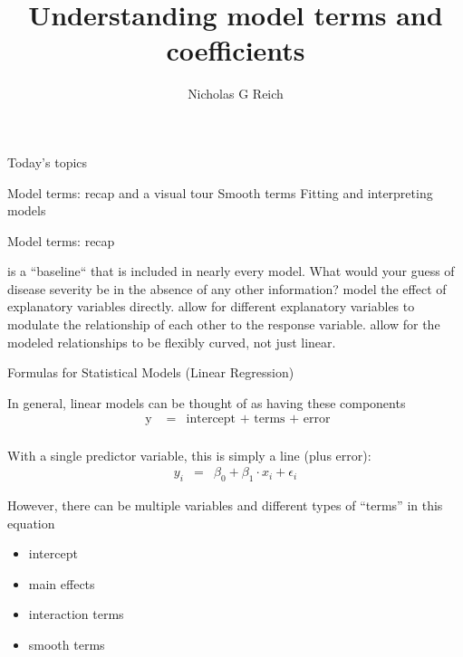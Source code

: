 \documentclass[table]{beamer}\usepackage[]{graphicx}\usepackage[]{color}
\title{Understanding model terms and coefficients}
\author{Nicholas G Reich}
\begin{document}
\begin{frame}[plain]
	\titlepage
\end{frame}











\begin{frame}{Today's topics}

\bi
    \myitem Model terms: recap and a visual tour
    \myitem Smooth terms
    \myitem Fitting and interpreting models
\ei



\end{frame}


\begin{frame}[fragile]{Model terms: recap}

\bi
   is a ``baseline`` that is included in nearly every model. What would your guess of disease severity be in the absence of any other information?
   model the effect of explanatory variables directly.
   allow for different explanatory variables to modulate the relationship of each other to the response variable.
   allow for the modeled relationships to be flexibly curved, not just linear.
\ei

\end{frame}


\begin{frame}[fragile]{Formulas for Statistical Models (Linear Regression)}

In general, linear models can be thought of as having these components
\begin{eqnarray*}
\mbox{ y } & = & \mbox{intercept + terms + error} \\
\end{eqnarray*}


With a single predictor variable, this is simply a line (plus error):
\begin{eqnarray*}
y_i & = & \beta_0 + \beta_1 \cdot x_i + \epsilon_i
\end{eqnarray*}

However, there can be multiple variables and different types of ``terms'' in this equation
\begin{itemize}
    \item intercept
    \item main effects
    \item interaction terms
    \item smooth terms
\end{itemize}

\end{frame}
\end{document}
